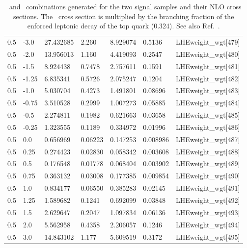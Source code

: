 \begin{table}[!htbp]
\begin{tabular}{lllllll}
    0.5  & -3.0  & 27.432685 & 2.260         & 8.929074  & 0.5136       & LHEweight\_wgt[479]\\
    0.5  & -2.0  & 13.956013 & 1.160         & 4.419093  & 0.2547       & LHEweight\_wgt[480]\\
    0.5  & -1.5  & 8.924438  & 0.7478        & 2.757611  & 0.1591       & LHEweight\_wgt[481]\\
    0.5  & -1.25 & 6.835341  & 0.5726        & 2.075247  & 0.1204       & LHEweight\_wgt[482]\\
    0.5  & -1.0  & 5.030704  & 0.4273        & 1.491801  & 0.08696      & LHEweight\_wgt[483]\\
    0.5  & -0.75 & 3.510528  & 0.2999        & 1.007273  & 0.05885      & LHEweight\_wgt[484]\\
    0.5  & -0.5  & 2.274811  & 0.1982        & 0.621663  & 0.03658      & LHEweight\_wgt[485]\\
    0.5  & -0.25 & 1.323555  & 0.1189        & 0.334972  & 0.01996      & LHEweight\_wgt[486]\\
    0.5  & 0.0   & 0.656969  & 0.06223       & 0.147253  & 0.008986     & LHEweight\_wgt[487]\\
    0.5  & 0.25  & 0.274423  & 0.02830       & 0.058342  & 0.003608     & LHEweight\_wgt[488]\\
    0.5  & 0.5   & 0.176548  & 0.01778       & 0.068404  & 0.003902     & LHEweight\_wgt[489]\\
    0.5  & 0.75  & 0.363132  & 0.03008       & 0.177385  & 0.009854     & LHEweight\_wgt[490]\\
    0.5  & 1.0   & 0.834177  & 0.06550       & 0.385283  & 0.02145      & LHEweight\_wgt[491]\\
    0.5  & 1.25  & 1.589682  & 0.1241        & 0.692099  & 0.03848      & LHEweight\_wgt[492]\\
    0.5  & 1.5   & 2.629647  & 0.2047        & 1.097834  & 0.06136      & LHEweight\_wgt[493]\\
    0.5  & 2.0   & 5.562958  & 0.4358        & 2.206057  & 0.1246       & LHEweight\_wgt[494]\\
    0.5  & 3.0   & 14.843102 & 1.177         & 5.609519  & 0.3172       & LHEweight\_wgt[495]\\ \hline
  \end{tabular}
  \caption[\CV\ and \Ct\ combinations.]{\CV\ and \Ct\ combinations generated for the two signal samples and their NLO cross sections. The \tHq\ cross section is multiplied by the branching fraction of the enforced leptonic decay of the top quark (0.324). See also Ref.~\cite{THQProdTwiki}.}\label{tab:reweight}
\end{table}

